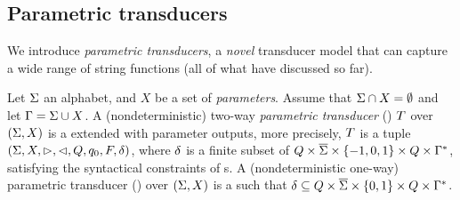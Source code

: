 

\subsection{Parametric transducers}

We introduce \emph{parametric transducers}, a \emph{novel} transducer model that can 
capture a wide range of string functions (all of what have discussed so far). 


\begin{definition}
    Let $\Sigma$ an alphabet, and $X$ be a set of \emph{parameters}. 
    Assume that $\Sigma \cap X = \emptyset$  and let $\Gamma = \Sigma \cup X$. 
    A (nondeterministic) two-way \emph{parametric transducer} (\PPT)  $T$ over 
    $(\Sigma,X)$ is a  \FFT{}  extended with  parameter outputs, more precisely, $T$ is a tuple 
    $(\Sigma, X, \vartriangleright, \vartriangleleft, Q, q_0, F, \delta)$, where
 $\delta$ is a finite subset of $Q \times 
    \overline{\Sigma}\times \{-1, 0, 1\}\times 
    Q \times \Gamma^*$, satisfying the syntactical constraints of \FFT{}s.   
    A (nondeterministic one-way) parametric transducer (\PT) over
    $(\Sigma,X)$ is a \PPT{} such that
 $\delta\subseteq Q \times 
    \overline{\Sigma}\times \{0, 1\}\times 
    Q \times \Gamma^*$.   
\end{definition}

